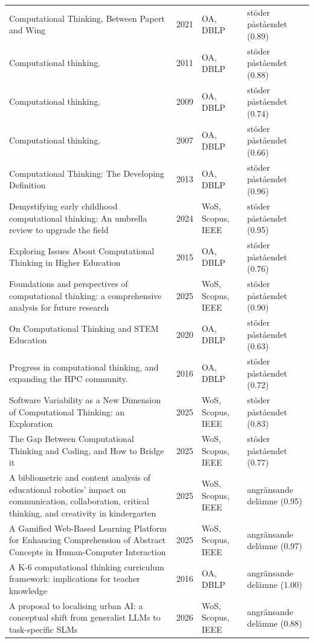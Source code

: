 \begin{longtable}{@{}%
  >{\raggedright\arraybackslash}p{}c%
  >{\raggedright\arraybackslash}p{}%
  >{\raggedright\arraybackslash}p{}@{}}
Computational Thinking, Between Papert and Wing & 2021 & OA, DBLP & stöder påståendet (0.89) \\
Computational thinking. & 2011 & OA, DBLP & stöder påståendet (0.88) \\
Computational thinking. & 2009 & OA, DBLP & stöder påståendet (0.74) \\
Computational thinking. & 2007 & OA, DBLP & stöder påståendet (0.66) \\
Computational Thinking: The Developing Definition & 2013 & OA, DBLP & stöder påståendet (0.96) \\
Demystifying early childhood computational thinking: An umbrella review to upgrade the field & 2024 & WoS, Scopus, IEEE & stöder påståendet (0.95) \\
Exploring Issues About Computational Thinking in Higher Education & 2015 & OA, DBLP & stöder påståendet (0.76) \\
Foundations and perspectives of computational thinking: a comprehensive analysis for future research & 2025 & WoS, Scopus, IEEE & stöder påståendet (0.90) \\
On Computational Thinking and STEM Education & 2020 & OA, DBLP & stöder påståendet (0.63) \\
Progress in computational thinking, and expanding the HPC community. & 2016 & OA, DBLP & stöder påståendet (0.72) \\
Software Variability as a New Dimension of Computational Thinking: an Exploration & 2025 & WoS, Scopus, IEEE & stöder påståendet (0.83) \\
The Gap Between Computational Thinking and Coding, and How to Bridge it & 2025 & WoS, Scopus, IEEE & stöder påståendet (0.77) \\
A bibliometric and content analysis of educational robotics' impact on communication, collaboration, critical thinking, and creativity in kindergarten & 2025 & WoS, Scopus, IEEE & angränsande delämne (0.95) \\
A Gamified Web-Based Learning Platform for Enhancing Comprehension of Abstract Concepts in Human-Computer Interaction & 2025 & WoS, Scopus, IEEE & angränsande delämne (0.97) \\
A K-6 computational thinking curriculum framework: implications for teacher knowledge & 2016 & OA, DBLP & angränsande delämne (1.00) \\
A proposal to localising urban AI: a conceptual shift from generalist LLMs to task-specific SLMs & 2026 & WoS, Scopus, IEEE & angränsande delämne (0.88) \\

\end{longtable}
